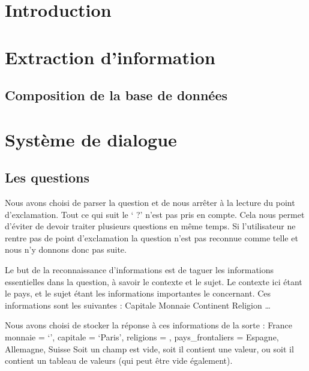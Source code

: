 \documentclass[11pt,a4paper]{article}
\begin{document}



\section{Introduction}


\section{Extraction d'information}
\subsection{Composition de la base de données}

\section{Système de dialogue}

\subsection{Les questions}

Nous avons choisi de parser la question et de nous arrêter à la lecture du point d’exclamation. Tout ce qui suit le ‘ ?’ n’est pas pris en compte. Cela nous permet d’éviter de devoir traiter plusieurs questions en même temps. Si l’utilisateur ne rentre pas de point d’exclamation la question n’est pas reconnue comme telle et nous n’y donnons donc pas suite.
 
Le but de la reconnaissance d’informations est de taguer les informations essentielles dans la question, à savoir le contexte et le sujet. Le contexte ici étant le pays, et le sujet étant les informations importantes le concernant. Ces informations sont les suivantes :
Capitale
Monnaie
Continent
Religion
…


Nous avons choisi de stocker la réponse à ces informations de la sorte :
France {
            	monnaie = ‘’,
            	capitale = ‘Paris’,
            	religions = {},
            	pays\_frontaliers = { Espagne, Allemagne, Suisse }
}
Soit un champ est vide, soit il contient une valeur, ou soit il contient un tableau de valeurs (qui peut être vide également).
 
\end{document}
